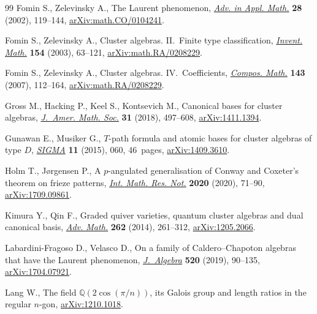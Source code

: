 \documentclass[11pt]{article}
\numberwithin{equation}{section}
\begin{document}
\begin{thebibliography}{99}
Fomin S., Zelevinsky A., The {L}aurent phenomenon, \href{https://doi.org/10.1006/aama.2001.0770}{\textit{Adv. in Appl. Math.}}
 \textbf{28} (2002), 119--144, \href{https://arxiv.org/abs/math.CO/0104241}{arXiv:math.CO/0104241}.

Fomin S., Zelevinsky A., Cluster algebras. {II}.~{F}inite type classification,
 \href{https://doi.org/10.1007/s00222-003-0302-y}{\textit{Invent. Math.}} \textbf{154} (2003), 63--121,
 \href{https://arxiv.org/abs/math.RA/0208229}{arXiv:math.RA/0208229}.

Fomin S., Zelevinsky A., Cluster algebras. {IV}.~{C}oefficients,
 \href{https://doi.org/10.1112/S0010437X06002521}{\textit{Compos. Math.}} \textbf{143} (2007), 112--164,
 \href{https://arxiv.org/abs/math.RA/0208229}{arXiv:math.RA/0208229}.

Gross M., Hacking P., Keel S., Kontsevich M., Canonical bases for cluster
 algebras, \href{https://doi.org/10.1090/jams/890}{\textit{J.~Amer. Math. Soc.}} \textbf{31} (2018), 497--608,
 \href{https://arxiv.org/abs/1411.1394}{arXiv:1411.1394}.

Gunawan E., Musiker G., {$T$}-path formula and atomic bases for cluster
 algebras of type {$D$}, \href{https://doi.org/10.3842/SIGMA.2015.060}{\textit{SIGMA}} \textbf{11} (2015), 060, 46~pages,
 \href{https://arxiv.org/abs/1409.3610}{arXiv:1409.3610}.

Holm T., J{\o}rgensen P., A {$p$}-angulated generalisation of {C}onway and
 {C}oxeter's theorem on frieze patterns, \href{https://doi.org/10.1093/imrn/rny020}{\textit{Int. Math. Res. Not.}}
 \textbf{2020} (2020), 71--90, \href{https://arxiv.org/abs/1709.09861}{arXiv:1709.09861}.

Kimura Y., Qin F., Graded quiver varieties, quantum cluster algebras and dual
 canonical basis, \href{https://doi.org/10.1016/j.aim.2014.05.014}{\textit{Adv. Math.}} \textbf{262} (2014), 261--312,
 \href{https://arxiv.org/abs/1205.2066}{arXiv:1205.2066}.

Labardini-Fragoso D., Velasco D., On a family of {C}aldero--{C}hapoton algebras
 that have the {L}aurent phenomenon, \href{https://doi.org/10.1016/j.jalgebra.2018.11.012}{\textit{J.~Algebra}} \textbf{520} (2019),
 90--135, \href{https://arxiv.org/abs/1704.07921}{arXiv:1704.07921}.

Lang W., The field $\mathbb{Q}(2\cos(\pi/n))$, its Galois group and length
 ratios in the regular $n$-gon, \href{https://arxiv.org/abs/1210.1018}{arXiv:1210.1018}.


\end{thebibliography}
\end{document}

